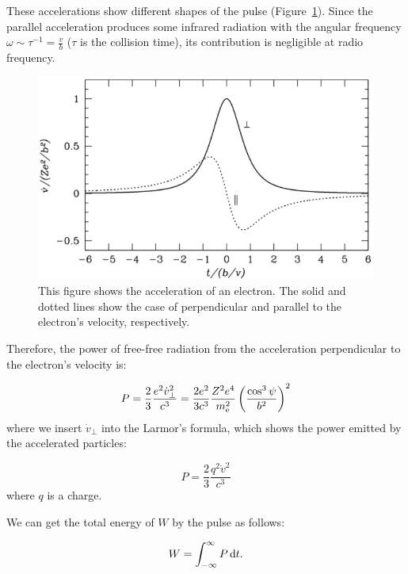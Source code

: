These accelerations show different shapes of the pulse (Figure~\ref{fig:nrao_radio4n3}).
Since the parallel acceleration produces some infrared radiation with the angular frequency $\omega \sim \tau^{-1} = \frac{v}{b}$ ($\tau$ is the collision time), its contribution is negligible at radio frequency.

\begin{figure}[htbp]
\centering
	\includegraphics[width=.8\linewidth]{Chapter_2/Figures/NRAO_radio4n3.png}
    \caption[The acceleration of an electron by an ion]{\label{fig:nrao_radio4n3}
        This figure shows the acceleration of an electron.
        The solid and dotted lines show the case of perpendicular and parallel to the electron's velocity, respectively.
    }
\end{figure}

Therefore, the power of free-free radiation from the acceleration perpendicular to the electron's velocity is:

\begin{equation}\label{eq:essential_radio4n17}
    P=\frac{2}{3} \frac{e^{2} \dot{v}_{\perp}^{2}}{c^{3}}=\frac{2 e^{2}}{3 c^{3}} \frac{Z^{2} e^{4}}{m_{\mathrm{e}}^{2}}\left(\frac{\cos ^{3} \psi}{b^{2}}\right)^{2}
\end{equation}
where we insert $\dot{v}_{\perp}$ into the Larmor's formula, which shows the power emitted by the accelerated particles:

\begin{equation}
    P = \frac{2}{3}\frac{q^2\dot{v}^2}{c^3}
\end{equation}
where $q$ is a charge.

We can get the total energy of $W$ by the pulse as follows:

\begin{equation}\label{eq:essential_radio4n18}
    W = \int^{\infty}_{-\infty} P\,\mathrm{d}t.
\end{equation}

